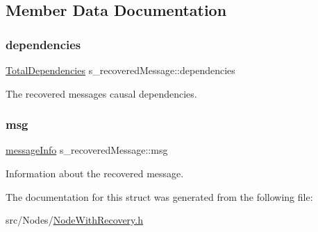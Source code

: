 \subsection{Member Data Documentation}
\mbox{\label{structs__recovered_message_a95db2608749458c7b7e70bd5b612ba2d}} 
\subsubsection{\texorpdfstring{dependencies}{dependencies}}
{\footnotesize\ttfamily \hyperlink{class_total_dependencies}{Total\+Dependencies} s\+\_\+recovered\+Message\+::dependencies}



The recovered message\textquotesingle{}s causal dependencies. 

\mbox{\label{structs__recovered_message_a585360581eb2222b2a9ec5b91076054a}} 
\subsubsection{\texorpdfstring{msg}{msg}}
{\footnotesize\ttfamily \hyperlink{structures_8h_a7e7bdc1d2fff8a9436f2f352b2711ed6}{message\+Info} s\+\_\+recovered\+Message\+::msg}



Information about the recovered message. 



The documentation for this struct was generated from the following file\+:\begin{DoxyCompactItemize}
\item 
src/\+Nodes/\hyperlink{_node_with_recovery_8h}{Node\+With\+Recovery.\+h}\end{DoxyCompactItemize}
